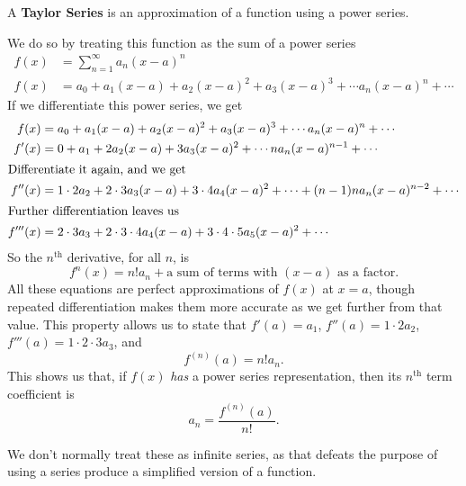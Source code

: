 A \textbf{Taylor Series} is an approximation of a function using a power series.

  We do so by treating this function as the sum of a power series
  \begin{align*}
    f(x) &= \sum^\infty_{n=1} a_n(x-a)^n \\
    f(x) &= a_0+a_1(x-a)+a_2 (x-a)^2 + a_3 (x-a)^3 + \cdots a_n (x-a)^n + \cdots
  \end{align*}
  If we differentiate this power series, we get
  \begin{align*}
    f(x) &= a_0+a_1(x-a)+a_2 (x-a)^2 + a_3 (x-a)^3 + \cdots a_n (x-a)^n + \cdots \\
    f'(x) &= 0+a_1+2a_2 (x-a) +3 a_3 (x-a)^2 + \cdots n a_n (x-a)^{n-1} + \cdots \\
    \intertext{Differentiate it again, and we get}
    f''(x) &= 1 \cdot 2a_2+2 \cdot 3 a_3 (x-a) + 3 \cdot 4 a_4 (x-a)^2 + \cdots + (n-1)n a_n (x-a)^{n-2} + \cdots \\
    \intertext{Further differentiation leaves us}
    f'''(x) &= 2 \cdot 3 a_3 + 2 \cdot 3 \cdot 4 a_4 (x-a) + 3 \cdot 4 \cdot 5 a_5 (x-a)^2 + \cdots
  \end{align*}
  So the $n^\textrm{th}$ derivative, for all $n$, is
  \[ f^n(x) = n! a_n + \textrm{a sum of terms with $(x-a)$ as a factor.} \]
  All these equations are perfect approximations of $f(x)$ at $x=a$, though repeated differentiation makes them more accurate as we get further from that value.
  This property allows us to state that $f'(a)=a_1$, $f''(a)=1 \cdot 2 a_2$, $f'''(a)=1 \cdot 2 \cdot 3 a_3$, and
  \[ f^{(n)}(a) = n! a_n.\]
  This shows us that, if $f(x)$ \emph{has} a power series representation, then its $n^\textrm{th}$ term coefficient is
  \[ a_n = \frac{f^{(n)}(a)}{n!}. \]
  \cite[p. 600]{thomas}

We don't normally treat these as infinite series, as that defeats the purpose of using a series produce a simplified version of a function.


